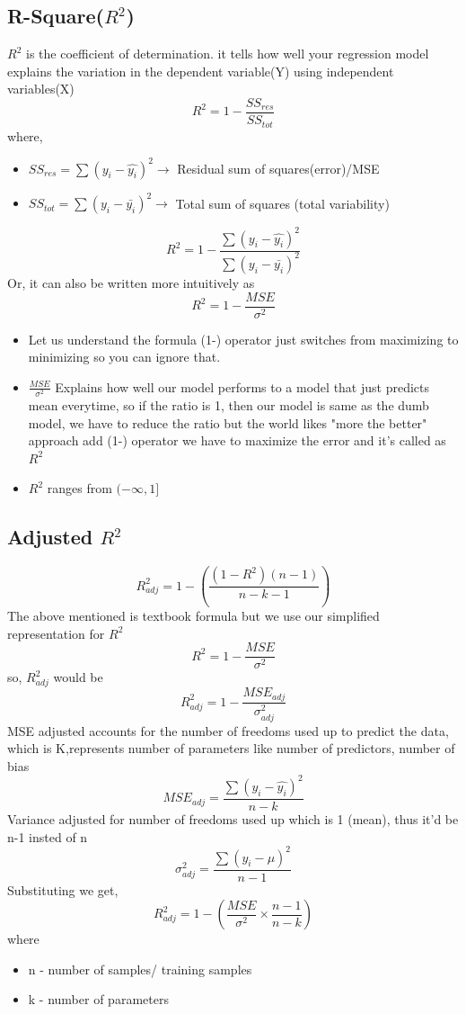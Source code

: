 \documentclass[12pt]{extarticle}
\begin{document}
\subsection{R-Square(\(R^2\))}
\(R^2\) is the coefficient of determination. it tells how well your regression model 
explains the variation in the dependent variable(Y) using independent variables(X)
$$R^2 = 1-\frac{SS_{res}}{SS_{tot}}$$
where,
\begin{itemize}
    \item \(SS_{res} = \sum(y_i - \hat{y_i})^2 \to\) Residual sum of squares(error)/MSE
    \item \( SS_{tot} = \sum(y_i - \bar{y_i})^2 \to\) Total sum of squares (total variability)
\end{itemize}
$$R^2 = 1-\frac{ \sum(y_i - \hat{y_i})^2 }{ \sum(y_i - \bar{y_i})^2} $$
Or, it can also be written more intuitively as 
$$ R^2 = 1 - \frac{MSE}{\sigma^2} $$

\begin{itemize}
    \item Let us understand the formula (1-) operator just switches from maximizing to minimizing
so you can ignore that. \\
    \item \(\frac{MSE}{\sigma^2}\) Explains how well our model performs to a model that 
just predicts mean everytime, so if the ratio is 1, then our model is same as the dumb model,
we have to reduce the ratio but the world likes "more the better" approach 
add (1-) operator we have to maximize the error and it's called as \(R^2\) 
\item \(R^2\) ranges from \((-\infty,1]\)
\end{itemize}

\subsection{Adjusted \(R^2\)}
$$ R^2_{adj} = 1 - \left(\frac{(1-R^2)(n-1)}{n-k-1}\right) $$
The above mentioned is textbook formula but we use our simplified 
representation for \(R^2\)
$$ R^2 = 1 - \frac{MSE}{\sigma^2} $$
so, \(R^2_{adj}\) would be
$$ R^2_{adj} = 1 - \frac{MSE_{adj}}{\sigma^2_{adj}} $$
MSE adjusted accounts for the number of freedoms used up to predict the data, 
which is K,represents number of parameters like number of predictors, number of bias
$$ MSE_{adj} = \frac{\sum(y_i-\hat{y_i})^2}{n-k} $$
Variance adjusted for number of freedoms used up which is 1 (mean), 
thus it'd be n-1 insted of n
$$ \sigma^2_{adj} = \frac{\sum(y_i-\mu)^2}{n-1} $$
Substituting we get,
$$ R^2_{adj} = 1 - \left(\frac{MSE}{\sigma^2} \times \frac{n-1}{n-k}\right) $$
where 
\begin{itemize}
    \item n - number of samples/ training samples
    \item k - number of parameters
\end{itemize}
\end{document}
